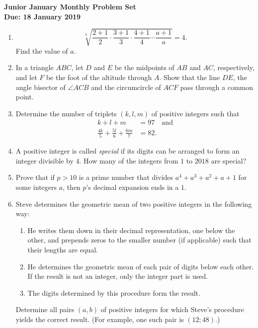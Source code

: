 \documentclass{article}
\begin{document}
\begin{center}
\textbf{\Large Junior January Monthly Problem Set}
\\ \vspace{1em}
\textbf{\large Due: 18 January 2019}
\end{center}

\begin{enumerate}[1.]

\item %
\[ \sqrt[3]{\frac{2+1}{2}\cdot\frac{3+1}{3}\cdot\frac{4+1}{4}\dotsm\frac{a+1}{a}} = 4. \]
Find the value of $a$.


\item %
In a triangle $ABC$, let $D$ and $E$ be the midpoints of $AB$ and $AC$, respectively, and let $F$ be the foot of the altitude through $A$. Show that the line $DE$, the angle bisector of $\angle ACB$ and the circumcircle of $ACF$ pass through a common point.


\item %
Determine the number of triplets $(k,l,m)$ of positive integers such that
\begin{align*}
  k+l+m &= 97 \quad \mathrm{and} \\
  \frac{4k}{5} +\frac{5l}{6} +\frac{6m}{7} &= 82.
\end{align*}


\item %
A positive integer is called \emph{special} if its digits can be arranged to form an integer divisible by $4$. How many of the integers from $1$ to $2018$ are special?


\item %
Prove that if $p > 10$ is a prime number that divides $a^4+a^3+a^2+a+1$ for some integers $a$, then $p$'s decimal expansion ends in a $1$.


\item %
Steve determines the geometric mean of two positive integers in the following way:
\begin{enumerate}
	\item He writes them down in their decimal representation, one below the other, and prepends zeros to the smaller number (if applicable) such that their lengths are equal.
	\item He determines the geometric mean of each pair of digits below each other. If the result is not an integer, only the integer part is used.
	\item The digits determined by this procedure form the result.
\end{enumerate}
Determine all pairs $(a,b)$ of positive integers for which Steve's procedure yields the correct result. (For example, one such pair is $(12; 48)$.)



\end{enumerate}
\end{document}
